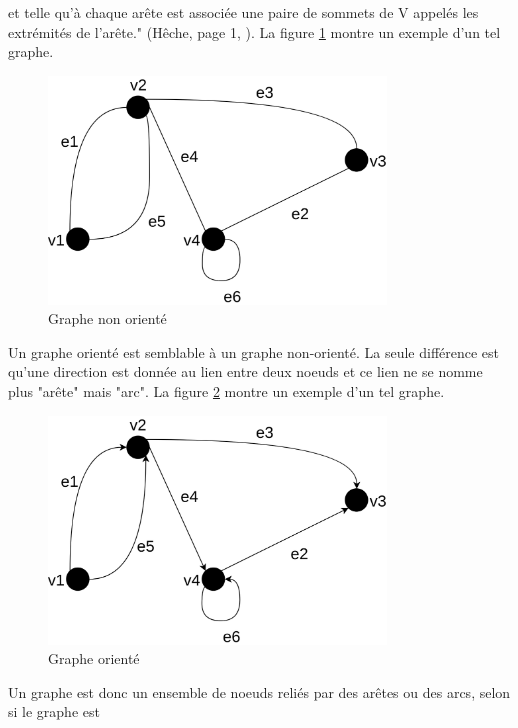 et telle qu'à chaque arête est associée une paire de sommets de V appelés les extrémités de 
l'arête." (Hêche, page 1, \cite{ref28}). La figure \ref{graph_undirected} montre un exemple d'un tel 
graphe. 
\begin{figure}
    \begin{center}
        \includegraphics[width=0.8\textwidth]{images/graph_undirected.png}
    \end{center}
    \caption{Graphe non orienté}
    \label{graph_undirected}
\end{figure}
Un graphe orienté est semblable à un graphe non-orienté. La seule différence est qu'une direction 
est donnée au lien entre deux noeuds et ce lien ne se nomme plus "arête" mais "arc". La figure 
\ref{graph_directed} montre un exemple d'un tel graphe.
\begin{figure}
    \begin{center}
        \includegraphics[width=0.8\textwidth]{images/graph_directed.png}
    \end{center}
    \caption{Graphe orienté}
    \label{graph_directed}
\end{figure}
Un graphe est donc un ensemble de noeuds reliés par des arêtes ou des arcs, selon si le graphe est 
